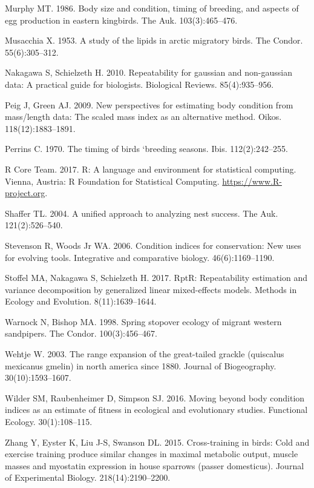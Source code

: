 \documentclass[
]{article}
\begin{document}
\leavevmode\hypertarget{ref-murphy1986body}{}%
Murphy MT. 1986. Body size and condition, timing of breeding, and
aspects of egg production in eastern kingbirds. The Auk.
103(3):465--476.

\leavevmode\hypertarget{ref-musacchia1953study}{}%
Musacchia X. 1953. A study of the lipids in arctic migratory birds. The
Condor. 55(6):305--312.

\leavevmode\hypertarget{ref-nakagawa2010repeatability}{}%
Nakagawa S, Schielzeth H. 2010. Repeatability for gaussian and
non-gaussian data: A practical guide for biologists. Biological Reviews.
85(4):935--956.

\leavevmode\hypertarget{ref-peig2009new}{}%
Peig J, Green AJ. 2009. New perspectives for estimating body condition
from mass/length data: The scaled mass index as an alternative method.
Oikos. 118(12):1883--1891.

\leavevmode\hypertarget{ref-perrins1970timing}{}%
Perrins C. 1970. The timing of birds `breeding seasons. Ibis.
112(2):242--255.

\leavevmode\hypertarget{ref-rcoreteam}{}%
R Core Team. 2017. R: A language and environment for statistical
computing. Vienna, Austria: R Foundation for Statistical Computing.
\url{https://www.R-project.org}.

\leavevmode\hypertarget{ref-shaffer2004unified}{}%
Shaffer TL. 2004. A unified approach to analyzing nest success. The Auk.
121(2):526--540.

\leavevmode\hypertarget{ref-stevenson2006condition}{}%
Stevenson R, Woods Jr WA. 2006. Condition indices for conservation: New
uses for evolving tools. Integrative and comparative biology.
46(6):1169--1190.

\leavevmode\hypertarget{ref-stoffel2017rptr}{}%
Stoffel MA, Nakagawa S, Schielzeth H. 2017. RptR: Repeatability
estimation and variance decomposition by generalized linear
mixed-effects models. Methods in Ecology and Evolution.
8(11):1639--1644.

\leavevmode\hypertarget{ref-warnock1998spring}{}%
Warnock N, Bishop MA. 1998. Spring stopover ecology of migrant western
sandpipers. The Condor. 100(3):456--467.

\leavevmode\hypertarget{ref-wehtje2003range}{}%
Wehtje W. 2003. The range expansion of the great-tailed grackle
(quiscalus mexicanus gmelin) in north america since 1880. Journal of
Biogeography. 30(10):1593--1607.

\leavevmode\hypertarget{ref-wilder2016moving}{}%
Wilder SM, Raubenheimer D, Simpson SJ. 2016. Moving beyond body
condition indices as an estimate of fitness in ecological and
evolutionary studies. Functional Ecology. 30(1):108--115.

\leavevmode\hypertarget{ref-zhang2015cross}{}%
Zhang Y, Eyster K, Liu J-S, Swanson DL. 2015. Cross-training in birds:
Cold and exercise training produce similar changes in maximal metabolic
output, muscle masses and myostatin expression in house sparrows (passer
domesticus). Journal of Experimental Biology. 218(14):2190--2200.
\end{document}
